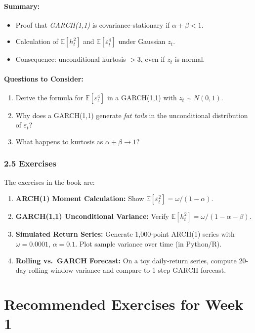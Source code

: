 \documentclass[11pt]{amsart}
\begin{document}
\paragraph{Summary:}
\begin{itemize}[noitemsep,left=0pt]
	\item Proof that \emph{GARCH(1,1)} is covariance‐stationary if $\alpha + \beta < 1$.
	\item Calculation of $\mathbb{E}[h_t^2]$ and $\mathbb{E}[\varepsilon_t^4]$ under Gaussian $z_t$.
	\item Consequence: unconditional kurtosis $> 3$, even if $z_t$ is normal.
\end{itemize}

\paragraph{Questions to Consider:}
\begin{enumerate}[noitemsep,left=0pt]
	\item Derive the formula for $\mathbb{E}[\varepsilon_t^4]$ in a GARCH(1,1) with $z_t \sim N(0,1)$.
	\item Why does a GARCH(1,1) generate \emph{fat tails} in the unconditional distribution of $\varepsilon_t$?
	\item What happens to kurtosis as $\alpha + \beta \to 1$?
\end{enumerate}

\subsubsection{2.5 Exercises}
The exercises in the book are:
\begin{enumerate}[noitemsep,left=0pt]
	\item \textbf{ARCH(1) Moment Calculation:} Show $\mathbb{E}[\varepsilon_t^2] = \omega/(1 - \alpha)$.
	\item \textbf{GARCH(1,1) Unconditional Variance:} Verify $\mathbb{E}[h_t^2] = \omega/(1 - \alpha - \beta)$.
	\item \textbf{Simulated Return Series:} Generate 1{,}000‐point ARCH(1) series with $\omega=0.0001$, $\alpha=0.1$. Plot sample variance over time (in Python/R).
	\item \textbf{Rolling vs.\ GARCH Forecast:} On a toy daily‐return series, compute 20‐day rolling‐window variance and compare to 1‐step GARCH forecast.
\end{enumerate}

\section{Recommended Exercises for Week 1}
\end{document}
